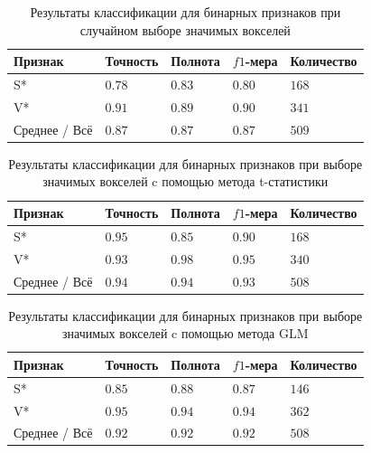 \begin{table}%
	\caption{Результаты классификации для бинарных признаков при случайном выборе значимых вокселей}\label{tbl:rnd_res}%
	\centering
	\begin{tabu}{|X[1.1]|X|X|X|X|}
		\hline
		Признак       & Точность & Полнота & $f1$-мера & Количество \\ \hline
		S*            & $0.78$   & $0.83$  & $0.80$    & $168$      \\ \hline
		V*            & $0.91$   & $0.89$  & $0.90$    & $341$      \\ \hline
		Среднее / Всё & $0.87$   & $0.87$  & $0.87$    & $509$      \\ \hline
	\end{tabu}
\end{table}


\begin{table}%
	\caption{Результаты классификации для бинарных признаков при выборе значимых вокселей  c помощью метода t-статистики}\label{tbl:ttest_res}%
	\centering
	\begin{tabu}{|X[1.1]|X|X|X|X|}
		\hline
		Признак       & Точность & Полнота & $f1$-мера & Количество \\ \hline
		S*            & $0.95$   & $0.85$  & $0.90$    & $168$      \\ \hline
		V*            & $0.93$   & $0.98$  & $0.95$    & $340$      \\ \hline
		Среднее / Всё & $0.94$   & $0.94$  & $0.93$    & $508$      \\ \hline
	\end{tabu}
\end{table}

\begin{table}%
	\caption{Результаты классификации для бинарных признаков при выборе значимых вокселей  c помощью метода GLM}\label{tbl:glm_res}%
	\centering
	\begin{tabu}{|X|X|X|X|X|}
		\hline
		Признак       & Точность & Полнота & $f1$-мера & Количество \\ \hline
		S*            &$ 0.85$     &$ 0.88$    &$ 0.87$      &$ 146$        \\ \hline
		V*            &$ 0.95$     &$ 0.94$    &$ 0.94$      &$ 362$        \\ \hline
		Среднее / Всё &$ 0.92$     &$ 0.92$    &$ 0.92$      &$ 508$        \\ \hline
	\end{tabu}
\end{table}